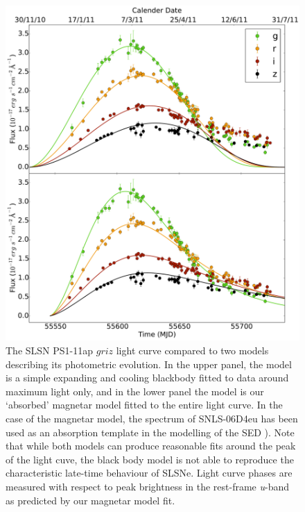 \begin{figure}
\includegraphics[width=\textwidth]{Figures/Chapter4/BB_Mag_comp}
\caption{The SLSN PS1-11ap $griz$ light curve \citep{2014MNRAS.437..656M} compared to two models describing its photometric evolution. In the upper panel, the model is a simple expanding and cooling blackbody fitted to data around maximum light only, and in the lower panel the model is our `absorbed' magnetar model fitted to the entire light curve. In the case of the magnetar model, the spectrum of SNLS-06D4eu \citep{2013ApJ...779...98H} has been used as an absorption template in the modelling of the SED ). Note that while both models can produce reasonable fits around the peak of the light cuve, the black body model is not able to reproduce the characteristic late-time behaviour of SLSNe. Light curve phases are measured with respect to peak brightness in the rest-frame \textit{u}-band as predicted by our magnetar model fit.}
\label{fig:BB_Mag}
\end{figure}

